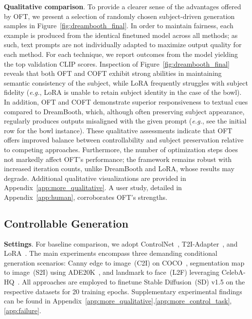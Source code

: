\textbf{Qualitative comparison}. To provide a clearer sense of the advantages offered by OFT, we present a selection of randomly chosen subject-driven generation samples in Figure~\ref{fig:dreambooth_final}. In order to maintain fairness, each example is produced from the identical finetuned model across all methods; as such, text prompts are not individually adapted to maximize output quality for each method. For each technique, we report outcomes from the model yielding the top validation CLIP scores. Inspection of Figure~\ref{fig:dreambooth_final} reveals that both OFT and COFT exhibit strong abilities in maintaining semantic consistency of the subject, while LoRA frequently struggles with subject fidelity (\emph{e.g.}, LoRA is unable to retain subject identity in the case of the bowl). In addition, OFT and COFT demonstrate superior responsiveness to textual cues compared to DreamBooth, which, although often preserving subject appearance, regularly produces outputs misaligned with the given prompt (\emph{e.g.}, see the initial row for the bowl instance). These qualitative assessments indicate that OFT offers improved balance between controllability and subject preservation relative to competing approaches. Furthermore, the number of optimization steps does not markedly affect OFT’s performance; the framework remains robust with increased iteration counts, unlike DreamBooth and LoRA, whose results may degrade. Additional qualitative visualizations are provided in Appendix~\ref{app:more_qualitative}. A user study, detailed in Appendix~\ref{app:human}, corroborates OFT’s strengths.

\subsection{Controllable Generation}

\textbf{Settings}. For baseline comparison, we adopt ControlNet~\cite{zhang2023adding}, T2I-Adapter~\cite{mou2023t2i}, and LoRA~\cite{hulora2022}. The main experiments encompass three demanding conditional generation scenarios: Canny edge to image~(C2I) on COCO~\cite{lin2014microsoft}, segmentation map to image~(S2I) using ADE20K~\cite{zhou2017scene}, and landmark to face~(L2F) leveraging CelebA-HQ~\cite{karras2018progressive,xia2021tedigan}. All approaches are employed to finetune Stable Diffusion~(SD) v1.5 on the respective datasets for 20 training epochs. Supplementary experimental findings can be found in Appendix~\ref{app:more_qualitative},\ref{app:more_control_task},\ref{app:failure}.

